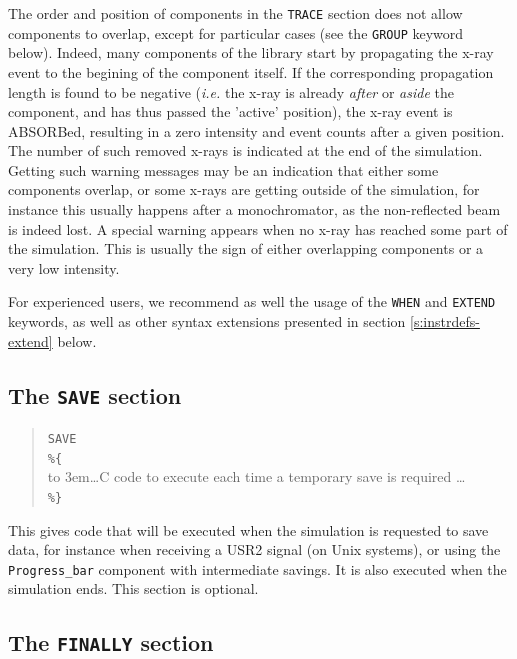 The order and position of components in the \texttt{TRACE} section does not
allow components to overlap, except for particular cases (see the \texttt{GROUP} keyword below).
Indeed, many components of the \MCX library  start
by propagating the x-ray event to the begining of the component itself.
If the corresponding propagation length is found to be negative
(\textit{i.e.} the x-ray is already \emph{after} or \emph{aside} the component, and has thus
passed the 'active' position), the x-ray event is ABSORBed, resulting in a zero intensity and event counts after a given position. The number of such removed x-rays is indicated at the end of the simulation.
Getting such warning messages may be an indication that either some
components overlap, or some x-rays are getting outside of the
simulation, for instance this usually happens after a monochromator,
as the non-reflected beam is indeed lost. A special warning appears
when no x-ray has reached some part of the simulation. This is usually the sign of either overlapping components or a very low intensity. 

For experienced users, we recommend as well the usage of the \texttt{WHEN} and \texttt{EXTEND} keywords, as well as other syntax extensions presented in section \ref{s:instrdefs-extend} below.

\subsection{The \texttt{SAVE} section}
\label{s:save}

\begin{quote}
  \texttt{SAVE} \\
  \verb|%{| \\
  \hbox to 3em{}\ldots C code to execute each time a temporary save is required \ldots \\
  \verb|%}|
\end{quote} 
This gives code that will be executed when the simulation is requested to save data, for instance when receiving a USR2 signal (on Unix systems), or using the \verb+Progress_bar+ component with intermediate savings. It is also executed when the simulation ends. This section is optional.

\subsection{The \texttt{FINALLY} section}
\label{s:finally}


